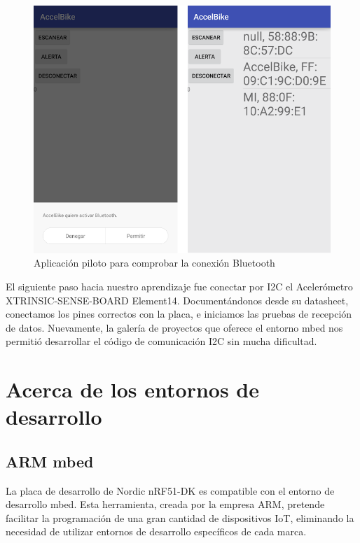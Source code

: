 \begin{figure}[h]%
	\centering 	
    \includegraphics[width=\textwidth]{figures/app_piloto2.PNG} %
   	\caption[Aplicación piloto para comprobar la conexión Bluetooth]{Aplicación piloto para comprobar la conexión Bluetooth}
   	\label{figuraAPPPrueba}
\end{figure}

El siguiente paso hacia nuestro aprendizaje fue conectar por I2C el Acelerómetro XTRINSIC-SENSE-BOARD Element14. Documentándonos desde su datasheet, conectamos los pines correctos con la placa, e iniciamos las pruebas de recepción de datos.
Nuevamente, la galería de proyectos que oferece el entorno mbed nos permitió desarrollar el código de comunicación I2C sin mucha dificultad.


\section{Acerca de los entornos de desarrollo}
\label{makereference4.2}

\subsection{ARM mbed}
\label{explicacionARMmbed}

La placa de desarrollo de Nordic nRF51-DK es compatible con el entorno de desarrollo mbed. Esta herramienta, creada por la empresa ARM, pretende facilitar la programación de una gran cantidad de dispositivos IoT, eliminando la necesidad de utilizar entornos de desarrollo específicos de cada marca.\\

